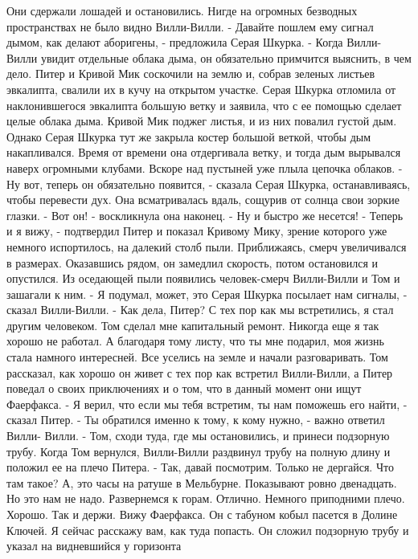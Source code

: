     Они сдержали лошадей и остановились. Нигде на огромных безводных 
пространствах не было видно Вилли-Вилли.
    - Давайте пошлем ему сигнал дымом, как делают аборигены, - 
предложила Серая Шкурка. - Когда Вилли-Вилли увидит отдельные облака 
дыма, он обязательно примчится выяснить, в чем дело.
    Питер и Кривой Мик соскочили на землю и, собрав зеленых листьев 
эвкалипта, свалили их в кучу на открытом участке. Серая Шкурка 
отломила от наклонившегося эвкалипта большую ветку и заявила, что с ее 
помощью сделает целые облака дыма.
    Кривой Мик поджег листья, и из них повалил густой дым. Однако 
Серая Шкурка тут же закрыла костер большой веткой, чтобы дым 
накапливался. Время от времени она отдергивала ветку, и тогда дым 
вырывался наверх огромными клубами. Вскоре над пустыней уже плыла 
цепочка облаков.
    - Ну вот, теперь он обязательно появится, - сказала Серая Шкурка, 
останавливаясь, чтобы перевести дух.
    Она всматривалась вдаль, сощурив от солнца свои зоркие глазки.
    - Вот он! - воскликнула она наконец. - Ну и быстро же несется!
    - Теперь и я вижу, - подтвердил Питер и показал Кривому Мику, 
зрение которого уже немного испортилось, на далекий столб пыли.
    Приближаясь, смерч увеличивался в размерах. Оказавшись рядом, он 
замедлил скорость, потом остановился и опустился. Из оседающей пыли 
появились человек-смерч Вилли-Вилли и Том и зашагали к ним.
    - Я подумал, может, это Серая Шкурка посылает нам сигналы, - 
сказал Вилли-Вилли. - Как дела, Питер? С тех пор как мы встретились, я 
стал другим человеком. Том сделал мне капитальный ремонт. Никогда еще 
я так хорошо не работал. А благодаря тому листу, что ты мне подарил, 
моя жизнь стала намного интересней.
    Все уселись на земле и начали разговаривать. Том рассказал, как 
хорошо он живет с тех пор как встретил Вилли-Вилли, а Питер поведал о 
своих приключениях и о том, что в данный момент они ищут Фаерфакса.
    - Я верил, что если мы тебя встретим, ты нам поможешь его найти, - 
сказал Питер.
    - Ты обратился именно к тому, к кому нужно, - важно ответил Вилли-
Вилли. - Том, сходи туда, где мы остановились, и принеси подзорную 
трубу.
    Когда Том вернулся, Вилли-Вилли раздвинул трубу на полную длину и 
положил ее на плечо Питера.
    - Так, давай посмотрим. Только не дергайся. Что там такое? А, это 
часы на ратуше в Мельбурне. Показывают ровно двенадцать. Но это нам не 
надо. Развернемся к горам. Отлично. Немного приподними плечо. Хорошо. 
Так и держи. Вижу Фаерфакса. Он с табуном кобыл пасется в Долине 
Ключей. Я сейчас расскажу вам, как туда попасть.
    Он сложил подзорную трубу и указал на видневшийся у горизонта 
